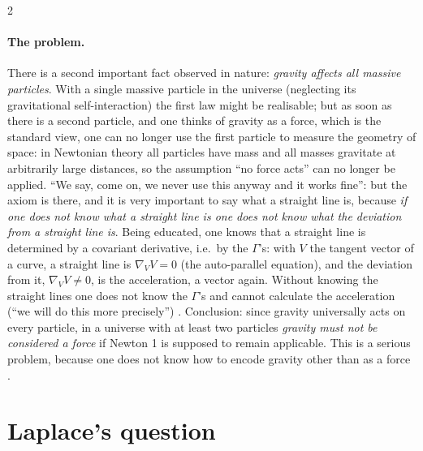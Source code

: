 \begin{paracol}{2}
\paragraph{The problem.} There is a second important fact observed in nature: \emph{gravity affects all massive particles}. With a single massive particle in the universe (neglecting its gravitational self-interaction) the first law might be realisable; but as soon as there is a second particle, and one thinks of gravity as a force, which is the standard view, one can no longer use the first particle to measure the geometry of space: in Newtonian theory all particles have mass and all masses gravitate at arbitrarily large distances, so the assumption ``no force acts'' can no longer be applied. ``We say, come on, we never use this anyway and it works fine'': but the axiom is there, and it is very important to say what a straight line is, because \emph{if one does not know what a straight line is one does not know what the deviation from a straight line is}.
Being educated, one knows that a straight line is determined by a covariant derivative, i.e.\ by the $\Gamma$'s: with $V$ the tangent vector of a curve, a straight line is $\nabla_VV=0$ (the auto-parallel equation), and the deviation from it, $\nabla_VV\neq0$, is the acceleration, a vector again. Without knowing the straight lines one does not know the $\Gamma$'s and cannot calculate the acceleration (``we will do this more precisely'')
.
Conclusion: since gravity universally acts on every particle, in a universe with at least two particles \emph{gravity must not be considered a force} if Newton 1 is supposed to remain applicable. This is a serious problem, because one does not know how to encode gravity other than as a force .

\section{Laplace's question}\label{sec:c09-laplace}


\end{paracol}
